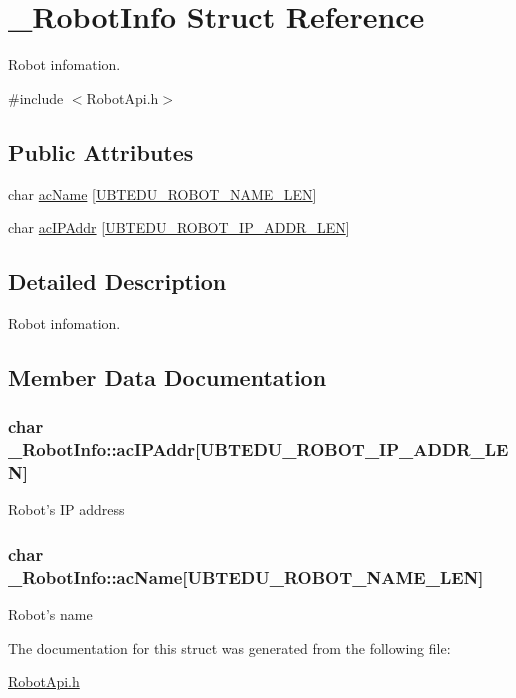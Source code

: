 \hypertarget{struct__RobotInfo}{\section{\-\_\-\-Robot\-Info Struct Reference}
\label{struct__RobotInfo}
}


Robot infomation.  




{\ttfamily \#include $<$Robot\-Api.\-h$>$}

\subsection*{Public Attributes}
\begin{DoxyCompactItemize}
\item 
char \hyperlink{struct__RobotInfo_a0dc600adfbf72150e776f100d6ec80ad}{ac\-Name} \mbox{[}\hyperlink{RobotApi_8h_aa37c5da3aea28e1d6eb93c3950ac7afe}{U\-B\-T\-E\-D\-U\-\_\-\-R\-O\-B\-O\-T\-\_\-\-N\-A\-M\-E\-\_\-\-L\-E\-N}\mbox{]}
\item 
char \hyperlink{struct__RobotInfo_aca220e4bd42b444cc5f105c4ceaf2760}{ac\-I\-P\-Addr} \mbox{[}\hyperlink{RobotApi_8h_ab92db2df9ca7c3c48ff6495f9bafc53d}{U\-B\-T\-E\-D\-U\-\_\-\-R\-O\-B\-O\-T\-\_\-\-I\-P\-\_\-\-A\-D\-D\-R\-\_\-\-L\-E\-N}\mbox{]}
\end{DoxyCompactItemize}


\subsection{Detailed Description}
Robot infomation. 

\subsection{Member Data Documentation}
\hypertarget{struct__RobotInfo_aca220e4bd42b444cc5f105c4ceaf2760}{
\subsubsection[{ac\-I\-P\-Addr}]{\setlength{\rightskip}{0pt plus 5cm}char \-\_\-\-Robot\-Info\-::ac\-I\-P\-Addr\mbox{[}{\bf U\-B\-T\-E\-D\-U\-\_\-\-R\-O\-B\-O\-T\-\_\-\-I\-P\-\_\-\-A\-D\-D\-R\-\_\-\-L\-E\-N}\mbox{]}}}\label{struct__RobotInfo_aca220e4bd42b444cc5f105c4ceaf2760}
Robot's I\-P address \hypertarget{struct__RobotInfo_a0dc600adfbf72150e776f100d6ec80ad}{
\subsubsection[{ac\-Name}]{\setlength{\rightskip}{0pt plus 5cm}char \-\_\-\-Robot\-Info\-::ac\-Name\mbox{[}{\bf U\-B\-T\-E\-D\-U\-\_\-\-R\-O\-B\-O\-T\-\_\-\-N\-A\-M\-E\-\_\-\-L\-E\-N}\mbox{]}}}\label{struct__RobotInfo_a0dc600adfbf72150e776f100d6ec80ad}
Robot's name 

The documentation for this struct was generated from the following file\-:\begin{DoxyCompactItemize}
\item 
\hyperlink{RobotApi_8h}{Robot\-Api.\-h}\end{DoxyCompactItemize}
